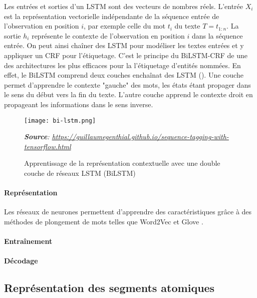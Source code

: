 Les entrées et sorties d'un LSTM sont des vecteurs de nombres réels. L'entrée $X_i$ est la représentation vectorielle indépendante de la séquence entrée de l'observation en position $i$, par exemple celle du mot $t_i$ du texte $T=t_{1:n}$. La sortie $h_i$ représente le contexte de l'observation en position $i$ dans la séquence entrée. On peut ainsi chaîner des LSTM pour modéliser les textes entrées et y appliquer un CRF pour l'étiquetage. C'est le principe du BiLSTM-CRF de \citet{lample2016nnner} une des architectures les plus efficaces pour la l'étiquetage d'entités nommées. En effet, le BiLSTM comprend deux couches enchaînat des LSTM (). Une couche permet d'apprendre le contexte "gauche" des mots, les états étant propager dans le sens du début vers la fin du texte. L'autre couche apprend le contexte droit en propageant les informations dans le sens inverse. 

\begin{figure}[!htb]
	\centering \texttt{[image: bi-lstm.png]}
		
	\textit{\footnotesize{\textbf{Source}: \url{https://guillaumegenthial.github.io/sequence-tagging-with-tensorflow.html}}}
	\caption{Apprentissage de la représentation contextuelle avec une double couche de réseaux LSTM (BiLSTM)}\label{fig:structuration:bi-lstm}
\end{figure}

\paragraph{Représentation}



Les réseaux de neurones permettent d'apprendre des caractéristiques  grâce à des méthodes de plongement de mots telles que Word2Vec \citep{mikolov2013word2vec} et Glove \citep{pennington2014glove}.  

\paragraph{Entraînement}

\paragraph{Décodage}







\subsection{Représentation des segments atomiques}

